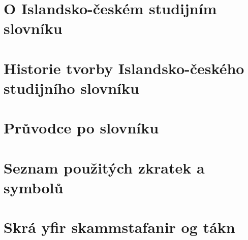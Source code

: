 \tableofcontents

\fi


\ifinputintroduction


\chapter{O Islandsko-českém studijním slovníku}



\chapter{Historie tvorby Islandsko-českého studijního slovníku}
\longchapterskip



\chapter{Průvodce po slovníku}
\begin{multicols}{2}
%
\end{multicols}


\chapter{Seznam použitých zkratek a symbolů}
%

\chapter{Skrá yfir skammstafanir og tákn}
%


